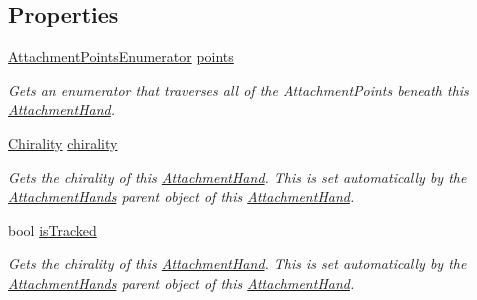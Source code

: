 \subsection*{Properties}
\begin{DoxyCompactItemize}
\item 
\mbox{\hyperlink{struct_leap_1_1_unity_1_1_attachments_1_1_attachment_hand_1_1_attachment_points_enumerator}{Attachment\+Points\+Enumerator}} \mbox{\hyperlink{class_leap_1_1_unity_1_1_attachments_1_1_attachment_hand_aeb29b522823d247cf907a2488f1fbebf}{points}}
\begin{DoxyCompactList}\small\item\em Gets an enumerator that traverses all of the Attachment\+Points beneath this \mbox{\hyperlink{class_leap_1_1_unity_1_1_attachments_1_1_attachment_hand}{Attachment\+Hand}}. \end{DoxyCompactList}\item 
\mbox{\hyperlink{namespace_leap_1_1_unity_a4d15adcf20ba121b2cd9c07f503b606f}{Chirality}} \mbox{\hyperlink{class_leap_1_1_unity_1_1_attachments_1_1_attachment_hand_af525bdb21f50e37061ce6b69a351654f}{chirality}}
\begin{DoxyCompactList}\small\item\em Gets the chirality of this \mbox{\hyperlink{class_leap_1_1_unity_1_1_attachments_1_1_attachment_hand}{Attachment\+Hand}}. This is set automatically by the \mbox{\hyperlink{class_leap_1_1_unity_1_1_attachments_1_1_attachment_hands}{Attachment\+Hands}} parent object of this \mbox{\hyperlink{class_leap_1_1_unity_1_1_attachments_1_1_attachment_hand}{Attachment\+Hand}}. \end{DoxyCompactList}\item 
bool \mbox{\hyperlink{class_leap_1_1_unity_1_1_attachments_1_1_attachment_hand_a30d8d19f9b563e6207b3d317ab29d6e7}{is\+Tracked}}
\begin{DoxyCompactList}\small\item\em Gets the chirality of this \mbox{\hyperlink{class_leap_1_1_unity_1_1_attachments_1_1_attachment_hand}{Attachment\+Hand}}. This is set automatically by the \mbox{\hyperlink{class_leap_1_1_unity_1_1_attachments_1_1_attachment_hands}{Attachment\+Hands}} parent object of this \mbox{\hyperlink{class_leap_1_1_unity_1_1_attachments_1_1_attachment_hand}{Attachment\+Hand}}. \end{DoxyCompactList}\end{DoxyCompactItemize}


